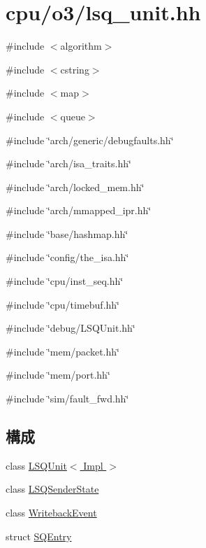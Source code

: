 \hypertarget{o3_2lsq__unit_8hh}{
\section{cpu/o3/lsq\_\-unit.hh}
\label{o3_2lsq__unit_8hh}
}
{\ttfamily \#include $<$algorithm$>$}\par
{\ttfamily \#include $<$cstring$>$}\par
{\ttfamily \#include $<$map$>$}\par
{\ttfamily \#include $<$queue$>$}\par
{\ttfamily \#include \char`\"{}arch/generic/debugfaults.hh\char`\"{}}\par
{\ttfamily \#include \char`\"{}arch/isa\_\-traits.hh\char`\"{}}\par
{\ttfamily \#include \char`\"{}arch/locked\_\-mem.hh\char`\"{}}\par
{\ttfamily \#include \char`\"{}arch/mmapped\_\-ipr.hh\char`\"{}}\par
{\ttfamily \#include \char`\"{}base/hashmap.hh\char`\"{}}\par
{\ttfamily \#include \char`\"{}config/the\_\-isa.hh\char`\"{}}\par
{\ttfamily \#include \char`\"{}cpu/inst\_\-seq.hh\char`\"{}}\par
{\ttfamily \#include \char`\"{}cpu/timebuf.hh\char`\"{}}\par
{\ttfamily \#include \char`\"{}debug/LSQUnit.hh\char`\"{}}\par
{\ttfamily \#include \char`\"{}mem/packet.hh\char`\"{}}\par
{\ttfamily \#include \char`\"{}mem/port.hh\char`\"{}}\par
{\ttfamily \#include \char`\"{}sim/fault\_\-fwd.hh\char`\"{}}\par
\subsection*{構成}
\begin{DoxyCompactItemize}
\item 
class \hyperlink{classLSQUnit}{LSQUnit$<$ Impl $>$}
\item 
class \hyperlink{classLSQUnit_1_1LSQSenderState}{LSQSenderState}
\item 
class \hyperlink{classLSQUnit_1_1WritebackEvent}{WritebackEvent}
\item 
struct \hyperlink{structLSQUnit_1_1SQEntry}{SQEntry}
\end{DoxyCompactItemize}
